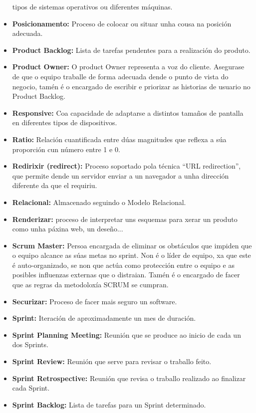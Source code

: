 \begin{itemize}
        tipos de sistemas operativos ou diferentes máquinas.
    \item \textbf{Posicionamento:} Proceso de colocar ou situar unha cousa na posición adecuada.
    \item \textbf{Product Backlog:} Lista de tarefas pendentes para a realización do produto.
    \item \textbf{Product Owner:} O product Owner representa a voz do cliente. Asegurase de que o equipo 
        traballe de forma adecuada dende o punto de vista do negocio, tamén é o encargado de 
        escribir e priorizar as historias de usuario no Product Backlog.
    \item \textbf{Responsive:} Coa capacidade de adaptarse a distintos tamaños de pantalla en diferentes 
        tipos de dispositivos.
    \item \textbf{Ratio:} Relación cuantificada entre dúas magnitudes que reflexa a súa proporción cun número
        entre 1 e 0.
    \item \textbf{Redirixir (redirect):} Proceso soportado pola técnica ``URL redirection'', que permite 
    dende un servidor enviar a un navegador a unha dirección diferente da que el requiriu.  
    \item \textbf{Relacional:} Almacenado seguindo o Modelo Relacional.
    \item \textbf{Renderizar:} proceso de interpretar uns esquemas para xerar un produto como unha páxina
        web, un deseño...
	\item \textbf{Scrum Master:} Persoa encargada de eliminar os obstáculos que impiden que o equipo alcance
        as súas metas no sprint. Non é o líder de equipo, xa que este é auto-organizado, se non que 
        actúa como protección entre o equipo e as posibles influenzas externas que o distraian. Tamén
        é o encargado de facer que as regras da metodoloxía SCRUM se cumpran.
    \item \textbf{Securizar:} Proceso de facer mais seguro un software. 
	\item \textbf{Sprint:} Iteración de aproximadamente un mes de duración. 
	\item \textbf{Sprint Planning Meeting:} Reunión que se produce ao inicio de cada un dos Sprints.	
	\item \textbf{Sprint Review:} Reunión que serve para revisar o traballo feito.
	\item \textbf{Sprint Retrospective:} Reunión que revisa o traballo realizado ao finalizar cada Sprint.
	\item \textbf{Sprint Backlog:} Lista de tarefas para un Sprint determinado.

\end{itemize}
